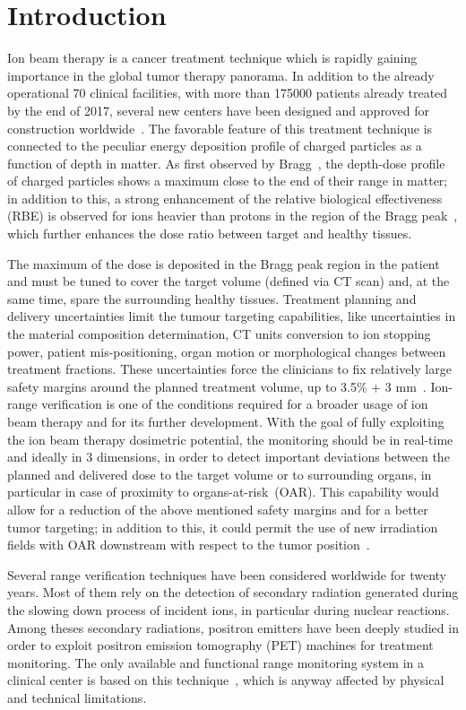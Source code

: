 \section{Introduction}\label{section::Intro}
Ion beam therapy is a cancer treatment technique which is rapidly gaining importance in the global tumor therapy panorama. In addition to the already operational 70 clinical facilities, with more than 175000 patients already treated by the end of 2017, several new centers have been designed and approved for construction worldwide~\cite{PTCOG_stats}. The favorable feature of this treatment technique is connected to the peculiar energy deposition profile of charged particles as a function of depth in matter. As first observed by Bragg~\cite{Bragg_main}, the depth-dose profile of charged particles shows a maximum close to the end of their range in matter; in addition to this, a strong enhancement of the relative biological effectiveness (RBE) is observed for ions heavier than protons in the region of the Bragg peak~\cite{RBE_Elsasser, RBE_Weyrather}, which further enhances the 
dose ratio between target and healthy tissues.

The maximum of the dose is deposited in the Bragg peak region in the patient and must be tuned to cover the target volume (defined via CT scan) and, at the same time, spare the surrounding healthy tissues. Treatment planning and delivery uncertainties limit the tumour targeting capabilities, like uncertainties in the material composition determination, CT units conversion to ion stopping power, patient mis-positioning, organ motion or morphological changes between treatment fractions. These uncertainties force the clinicians to fix relatively large safety margins around the planned treatment volume, up to 3.5\% + 3 mm~\cite{Paganetti:2012aa}. Ion-range verification is one of the conditions required for a broader usage of ion beam therapy and for its further development. With the goal of fully exploiting the ion beam therapy dosimetric potential, the monitoring should be in real-time and ideally in 3 dimensions, in order to detect important deviations between the planned and delivered dose to the target volume or to surrounding organs, in particular in case of proximity to organs-at-risk~(OAR). This capability would allow for a reduction of the above mentioned safety margins and for a better tumor targeting; in addition to this, it could permit the use of new irradiation fields with OAR downstream with respect to the tumor position~\cite{Knopf:2013aa}.   

Several range verification techniques have been considered worldwide for twenty years. Most of them rely on the detection of secondary radiation generated during the slowing down process of incident ions, in particular during nuclear reactions. Among theses secondary radiations, positron emitters have been deeply studied in order to exploit positron emission tomography (PET) machines for treatment monitoring. The only available and functional range monitoring system in a clinical center is based on this technique~\cite{ENGHARDT2004}, which is anyway affected by physical and technical limitations\cite{PARODI2016}.

